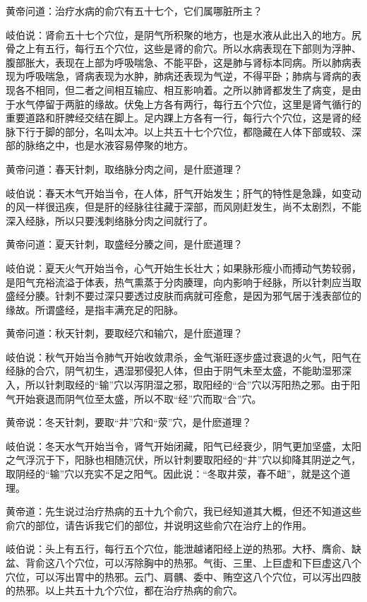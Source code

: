 \documentclass[a4paper,12pt,UTF8,twoside]{ctexbook}
\begin{document}
黄帝问道：治疗水病的俞穴有五十七个，它们属哪脏所主？

岐伯说：肾俞五十七个穴位，是阴气所积聚的地方，也是水液从此出入的地方。尻骨之上有五行，每行五个穴位，这些是肾的俞穴。所以水病表现在下部则为浮肿、腹部胀大，表现在上部为呼吸喘急、不能平卧，这是肺与肾标本同病。所以肺病表现为呼吸喘急，肾病表现为水肿，肺病还表现为气逆，不得平卧；肺病与肾病的表现各不相同，但二者之间相互输应、相互影响着。之所以肺肾都发生了病变，是由于水气停留于两脏的缘故。伏兔上方各有两行，每行五个穴位，这里是肾气循行的重要道路和肝脾经交结在脚上。足内踝上方各有一行，每行六个穴位，这是肾的经脉下行于脚的部分，名叫太冲。以上共五十七个穴位，都隐藏在人体下部或较、深部的脉络之中，也是水液容易停聚的地方。

黄帝问道：春天针刺，取络脉分肉之间，是什麽道理？

岐伯说：春天木气开始当令，在人体，肝气开始发生；肝气的特性是急躁，如变动的风一样很迅疾，但是肝的经脉往往藏于深部，而风刚赶发生，尚不太剧烈，不能深入经脉，所以只要浅刺络脉分肉之间就行了。

黄帝问道：夏天针刺，取盛经分腠之间，是什麽道理？

岐伯说：夏天火气开始当令，心气开始生长壮大；如果脉形瘦小而搏动气势较弱，是阳气充裕流溢于体表，热气熏蒸于分肉腠理，向内影响于经脉，所以针刺应当取盛经分腠。针刺不要过深只要透过皮肤而病就可痊愈，是因为邪气居于浅表部位的缘故。所谓盛经，是指丰满充足的阳脉。

黄帝问道：秋天针刺，要取经穴和输穴，是什麽道理？

岐伯说：秋气开始当令肺气开始收敛肃杀，金气渐旺逐步盛过衰退的火气，阳气在经脉的合穴，阴气初生，遇湿邪侵犯人体，但由于阴气未至太盛，不能助湿邪深入，所以针刺取经的“输”穴以泻阴湿之邪，取阳经的“合”穴以泻阳热之邪。由于阳气开始衰退而阴气位至太盛，所以不取“经”穴而取“合”穴。

黄帝说：冬天针刺，要取“井”穴和“荥”穴，是什麽道理？

岐伯说：冬天水气开始当令，肾气开始闭藏，阳气已经衰少，阴气更加坚盛，太阳之气浮沉于下，阳脉也相随沉伏，所以针刺要取阳经的“井”穴以抑降其阴逆之气，取阴经的“输”穴以充实不足之阳气。因此说：“冬取井荥，春不衄”，就是这个道理。

黄帝道：先生说过治疗热病的五十九个俞穴，我已经知道其大概，但还不知道这些俞穴的部位，请告诉我它们的部位，并说明这些俞穴在治疗上的作用。

岐伯说：头上有五行，每行五个穴位，能泄越诸阳经上逆的热邪。大杼、膺俞、缺盆、背俞这八个穴位，可以泻除胸中的热邪。气街、三里、上巨虚和下巨虚这八个穴位，可以泻出胃中的热邪。云门、肩髃、委中、贿空这八个穴位，可以泻出四肢的热邪。以上共五十九个穴位，都在治疗热病的俞穴。
\end{document}

